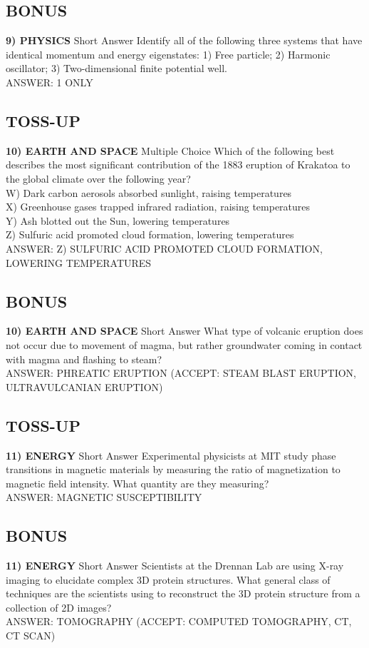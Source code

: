 \documentclass{article}
\begin{document}
\subsection*{BONUS}
\textbf{9) PHYSICS} Short Answer Identify all of the following three systems that have identical momentum and energy eigenstates: 1) Free particle; 2) Harmonic oscillator; 3) Two-dimensional finite potential well.
\\ANSWER: 1 ONLY

\subsection*{TOSS-UP}
\textbf{10) EARTH AND SPACE} Multiple Choice Which of the following best describes the most significant contribution of the 1883 eruption of Krakatoa to the global climate over the following year?
\\W) Dark carbon aerosols absorbed sunlight, raising temperatures
\\X) Greenhouse gases trapped infrared radiation, raising temperatures
\\Y) Ash blotted out the Sun, lowering temperatures
\\Z) Sulfuric acid promoted cloud formation, lowering temperatures
\\ANSWER: Z) SULFURIC ACID PROMOTED CLOUD FORMATION, LOWERING TEMPERATURES

\subsection*{BONUS}
\textbf{10) EARTH AND SPACE} Short Answer What type of volcanic eruption does not occur due to movement of magma, but rather groundwater coming in contact with magma and flashing to steam?
\\ANSWER: PHREATIC ERUPTION (ACCEPT: STEAM BLAST ERUPTION, ULTRAVULCANIAN ERUPTION)

\subsection*{TOSS-UP}
\textbf{11) ENERGY} Short Answer Experimental physicists at MIT study phase transitions in magnetic materials by measuring the ratio of magnetization to magnetic field intensity. What quantity are they measuring?
\\ANSWER: MAGNETIC SUSCEPTIBILITY

\subsection*{BONUS}
\textbf{11) ENERGY} Short Answer Scientists at the Drennan Lab are using X-ray imaging to elucidate complex 3D protein structures. What general class of techniques are the scientists using to reconstruct the 3D protein structure from a collection of 2D images?
\\ANSWER: TOMOGRAPHY (ACCEPT: COMPUTED TOMOGRAPHY, CT, CT SCAN)
\end{document}
